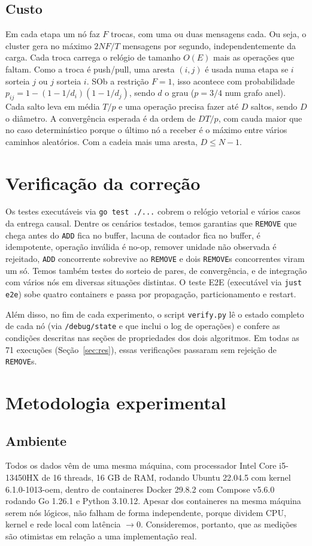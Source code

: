 \documentclass[conference,a4paper]{IEEEtran}
\begin{document}
\subsection{Custo}
Em cada etapa um nó faz $F$ trocas, com uma ou duas mensagens cada. Ou seja, o cluster gera no máximo $2NF/T$ mensagens por segundo, independentemente da carga. Cada troca carrega o relógio de tamanho $O(E)$ mais as operações que faltam. Como a troca é push/pull, uma aresta $(i,j)$ é usada numa etapa se $i$ sorteia $j$ ou $j$ sorteia $i$. SOb a restrição $F = 1$, isso acontece com probabilidade $p_{ij}=1-(1-1/d_i)(1-1/d_j)$, sendo $d$ o grau ($p=3/4$ num grafo anel). Cada salto leva em média $T/p$ e uma operação precisa fazer até $D$ saltos, sendo $D$ o diâmetro. A convergência esperada é da ordem de $DT/p$, com cauda maior que no caso determinístico porque o último nó a receber é o máximo entre vários caminhos aleatórios. Com a cadeia mais uma aresta, $D \le N-1$.

\section{Verificação da correção}\label{sec:ver}
Os testes executáveis via \texttt{go test ./...} cobrem o relógio vetorial e vários casos da entrega causal. Dentre os cenários testados, temos garantias que \texttt{REMOVE} que chega antes do \texttt{ADD} fica no buffer, lacuna de contador fica no buffer, é idempotente, operação inválida é no-op, remover unidade não observada é rejeitado, \texttt{ADD} concorrente sobrevive ao \texttt{REMOVE} e dois
\texttt{REMOVE}s concorrentes viram um só. Temos também testes do sorteio de pares, de convergência, e de integração com vários nós em diversas situações distintas. O teste E2E (executável via \texttt{just e2e}) sobe quatro containers e passa por propagação, particionamento e restart.

Além disso, no fim de cada experimento, o script \texttt{verify.py} lê o
estado completo de cada nó (via \texttt{/debug/state} e que inclui o log de
operações) e confere as condições descritas nas seções de propriedades dos dois algoritmos. Em todas as 71 execuções (Seção~\ref{sec:res}), essas verificações passaram sem rejeição de \texttt{REMOVE}s.

\section{Metodologia experimental}\label{sec:met}
\subsection{Ambiente}
Todos os dados vêm de uma mesma máquina, com processador Intel Core i5-13450HX de 16 threads, 16 GB de RAM, rodando Ubuntu 22.04.5 com kernel 6.1.0-1013-oem, dentro de containeres Docker 29.8.2 com Compose v5.6.0 rodando Go 1.26.1 e Python 3.10.12. Apesar dos containeres na mesma máquina serem nós lógicos, não falham de forma independente, porque dividem CPU, kernel e rede local com latência $\to 0$. Consideremos, portanto, que as medições são otimistas em relação a uma implementação real.
\end{document}
